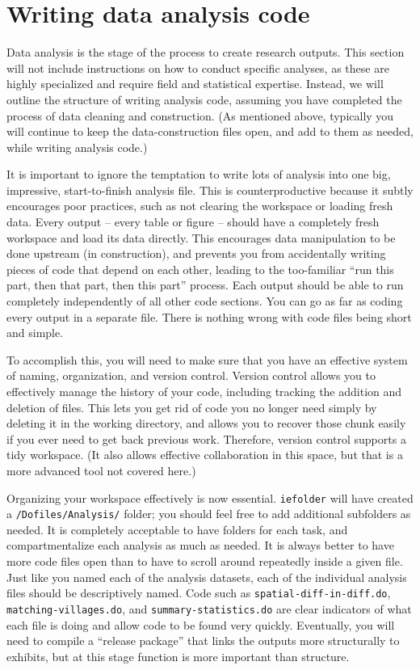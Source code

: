 
\section{Writing data analysis code}

Data analysis is the stage of the process to create research outputs.
This section will not include instructions on how to conduct specific analyses,
as these are highly specialized and require field and statistical expertise.
Instead, we will outline the structure of writing analysis code,
assuming you have completed the process of data cleaning and construction.
(As mentioned above, typically you will continue to keep
the data-construction files open, and add to them as needed,
while writing analysis code.)

It is important to ignore the temptation to write lots of analysis
into one big, impressive, start-to-finish analysis file.
This is counterproductive because it subtly encourages poor practices,
such as not clearing the workspace or loading fresh data.
Every output -- every table or figure -- should have
a completely fresh workspace and load its data directly.
This encourages data manipulation to be done upstream (in construction),
and prevents you from accidentally writing pieces of code
that depend on each other, leading to the too-familiar
``run this part, then that part, then this part'' process.
Each output should be able to run completely independently
of all other code sections.
You can go as far as coding every output in a separate file.
There is nothing wrong with code files being short and simple.

To accomplish this, you will need to make sure that you
have an effective system of naming, organization, and version control.
Version control allows you to effectively manage the history of your code,
including tracking the addition and deletion of files.
This lets you get rid of code you no longer need
simply by deleting it in the working directory,
and allows you to recover those chunk easily
if you ever need to get back previous work.
Therefore, version control supports a tidy workspace.
(It also allows effective collaboration in this space,
but that is a more advanced tool not covered here.)

Organizing your workspace effectively is now essential.
\texttt{iefolder} will have created a \texttt{/Dofiles/Analysis/} folder;
you should feel free to add additional subfolders as needed.
It is completely acceptable to have folders for each task,
and compartmentalize each analysis as much as needed.
It is always better to have more code files open
than to have to scroll around repeatedly inside a given file.
Just like you named each of the analysis datasets,
each of the individual analysis files should be descriptively named.
Code such as \texttt{spatial-diff-in-diff.do},
\texttt{matching-villages.do}, and \texttt{summary-statistics.do}
are clear indicators of what each file is doing
and allow code to be found very quickly.
Eventually, you will need to compile a ``release package''
that links the outputs more structurally to exhibits,
but at this stage function is more important than structure.

